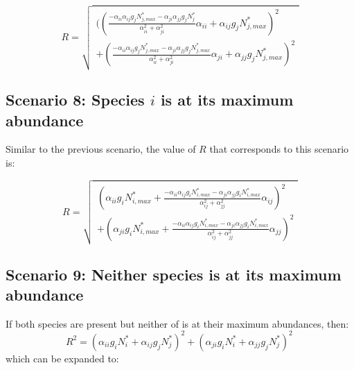 \begin{refsection}
\begin{equation}
  R = \sqrt{
\begin{aligned}
  ((\frac{- \alpha_{ii}\alpha_{ij}g_{j}N_{j,max}^{*} - \alpha_{ji}\alpha_{jj}g_{j}N_{j}^{*}}{\alpha_{ii}^2 + \alpha_{ji}^2}\alpha_{ii} + \alpha_{ij}g_{j}N_{j,max}^{*} )^2 \\
  + (\frac{- \alpha_{ii}\alpha_{ij}g_{j}N_{j,max}^{*} - \alpha_{ji}\alpha_{jj}g_{j}N_{j,max}^{*}}{\alpha_{ii}^2 + \alpha_{ji}^2}\alpha_{ji} + \alpha_{jj}g_{j}N_{j,max}^{*} )^2
\end{aligned}
}
\label{scenario7}
\end{equation}



\subsection*{Scenario 8: Species $i$ is at its maximum abundance}

Similar to the previous scenario, the value of $R$ that corresponds to this scenario is:


\begin{equation}
  R = \sqrt{
\begin{aligned}
  (\alpha_{ii}g_{i}N_{i,max}^{*} + \frac{-\alpha_{ii}\alpha_{ij}g_{i}N_{i,max}^{*} - \alpha_{ji}\alpha_{jj}g_{i}N_{i,max}^{*}}{\alpha_{ij}^{2} + \alpha_{jj}^{2}}\alpha_{ij} )^2 \\
  + (\alpha_{ji}g_{i}N_{i,max}^{*} + \frac{-\alpha_{ii}\alpha_{ij}g_{i}N_{i,max}^{*} - \alpha_{ji}\alpha_{jj}g_{i}N_{i,max}^{*}}{\alpha_{ij}^{2} + \alpha_{jj}^{2}}\alpha_{jj} )^2
\end{aligned}
}
\label{scenario8}
\end{equation}


\subsection*{Scenario 9: Neither species is at its maximum abundance}

If both species are present but neither of is at their maximum abundances, then:
\begin{equation}
  R^{2} =  (\alpha_{ii}g_{i}N_{i}^{*} + \alpha_{ij}g_{j}N_{j}^{*}) ^{2} + (\alpha_{ji}g_{i}N_{i}^{*} +\alpha_{jj}g_{j}N_{j}^{*})^{2} \,
\end{equation}
which can be expanded to:


\end{refsection}
